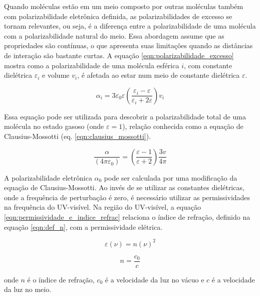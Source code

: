 	Quando moléculas estão em um meio composto por outras moléculas também com polarizabilidade eletrônica definida, as polarizabilidades de excesso se tornam relevantes, ou seja, é a diferença entre a polarizabilidade de uma molécula com a polarizabilidade natural do meio. Essa abordagem assume que as propriedades são contínuas, o que apresenta suas limitações quando as distâncias de interação são bastante curtas. A equação \ref{eqn:polarizabilidade_excesso} mostra como a polarizabilidade de uma molécula esférica \(i\), com constante dielétrica \(\varepsilon_i\) e volume \(v_i\), é afetada ao estar num meio de constante dielétrica \(\varepsilon\).
	
	\begin{equation}
		\alpha_i = 3 \varepsilon_{ 0 } \varepsilon \left( \dfrac{\varepsilon_i - \varepsilon}{\varepsilon_i + 2 \varepsilon}  \right) v_i
		\label{eqn:polarizabilidade_excesso}
	\end{equation}
	 
	 Essa equação pode ser utilizada para descobrir a polarizabilidade total de uma molécula no estado gasoso (onde \(\varepsilon = 1\)), relação conhecida como a equação de Clausius-Mossotti (eq. \ref{eqn:clausius_mossotti}).
	 
	 \begin{equation}
		\dfrac { \alpha } { \left( 4 \pi \varepsilon _ { 0 } \right) } = \left( \dfrac { \varepsilon - 1 } { \varepsilon + 2 } \right) \dfrac { 3 v } { 4 \pi }
		\label{eqn:clausius_mossotti}
	 \end{equation}
	
	A polarizabilidade eletrônica \(\alpha_0\) pode ser calculada por uma modificação da equação de Clausius-Mossotti. Ao invés de se utilizar as constantes dielétricas, onde a frequência de perturbação é zero, é necessário utilizar as permissividades na frequência do UV-visível. Na região do UV-visível, a equação \ref{eqn:permissividade_e_indice_refrac} relaciona o índice de refração, definido na equação \ref{eqn:def_n}, com a permissividade elétrica.
	
	\begin{equation}
		\varepsilon(\nu) = n(\nu)^2
		\label{eqn:permissividade_e_indice_refrac}
	\end{equation}
	
	\begin{equation}
		n = \dfrac{c_0}{c}
		\label{eqn:def_n}
	\end{equation}
	
	\noindent onde \(n\) é o índice de refração, \(c_0\) é a velocidade da luz no vácuo e \(c\) é a velocidade da luz no meio.
	

